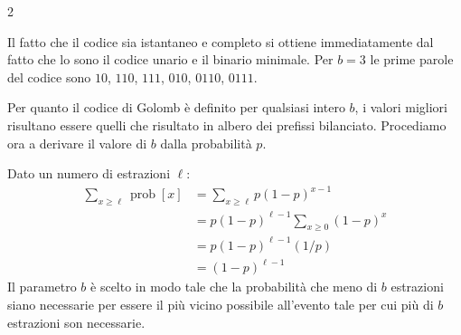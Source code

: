 \documentclass[\main/main.tex]{subfiles}
\begin{document}
\begin{multicols}{2}
\begin{definition}
\[    \]
    Il fatto che il codice sia istantaneo e completo si ottiene immediatamente dal fatto che lo sono il codice unario e il binario minimale. Per \(b=3\) le prime parole del codice sono \(10\), \(110\), \(111\), \(010\), \(0110\), \(0111\).
\end{definition}
\begin{analysis}
    Per quanto il codice di Golomb è definito per qualsiasi intero \(b\), i valori migliori risultano essere quelli che risultato in albero dei prefissi bilanciato. Procediamo ora a derivare il valore di \(b\) dalla probabilità \(p\).
    
    Dato un numero di estrazioni \(\ell\):
    \[\begin{aligned} \sum_{x \geq \ell} \operatorname{prob}[x] &=\sum_{x \geq \ell} p(1-p)^{x-1} \\ &=p(1-p)^{\ell-1} \sum_{x \geq 0}(1-p)^{x} \\ &=p(1-p)^{\ell-1}(1 / p) \\ &=(1-p)^{\ell-1} \end{aligned}\]
    Il parametro \(b\) è scelto in modo tale che la probabilità che meno di \(b\) estrazioni siano necessarie per essere il più vicino possibile all'evento tale per cui più di \(b\) estrazioni son necessarie.
    

\end{analysis}
\end{multicols}
\end{document}
